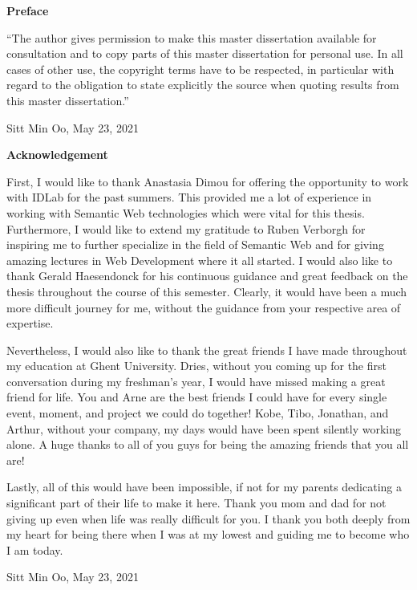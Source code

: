 
\newpage
{}
{}
\noindent \textbf{\huge Preface}

\vspace{1.5cm}

\noindent
``The author gives permission to make this master dissertation available for consultation and to copy parts
of this master dissertation for personal use. In all cases of other use, the copyright terms have to be respected,
in particular with regard to the obligation to state explicitly the source when quoting results from this master
dissertation.''

\vspace{1cm}

\noindent Sitt Min Oo, May 23, 2021 


\newpage
{}
{}
\noindent \textbf{\huge Acknowledgement}

\vspace{1.5cm}
First, I would like to thank Anastasia Dimou for offering the opportunity to 
work with IDLab for the past summers. This provided me a lot of experience 
in working with Semantic Web technologies which were vital for this 
thesis. Furthermore, I would like to extend my gratitude to Ruben Verborgh 
for inspiring me to further specialize in the field of Semantic Web and for giving amazing 
lectures in Web Development where it all started. I would also like to thank Gerald Haesendonck for 
his continuous guidance and great feedback on the thesis throughout the course of this semester. 
Clearly, it would have been a much more difficult journey for me, without the guidance from your 
respective area of expertise.

Nevertheless, I would also like to thank the great friends I have made throughout my education 
at Ghent University. Dries, without you coming up for the first conversation during my freshman's year, I would 
have missed making a great friend for life. You and Arne are the best friends I could have for every single 
event, moment, and project we could do together! Kobe, Tibo, Jonathan, and Arthur, without your company,  
my days would have been spent silently working alone. 
A huge thanks to all of you guys for being the amazing friends that you all are!  

Lastly, all of this would have been impossible, if not for my parents dedicating a significant part of 
their life to make it here. Thank you mom and dad for not giving up even when life was really difficult 
for you. 
I thank you both deeply from my heart for being there when I was at my lowest and guiding me to become 
who I am today. 

\vspace{1cm}
\noindent Sitt Min Oo, May 23, 2021 
